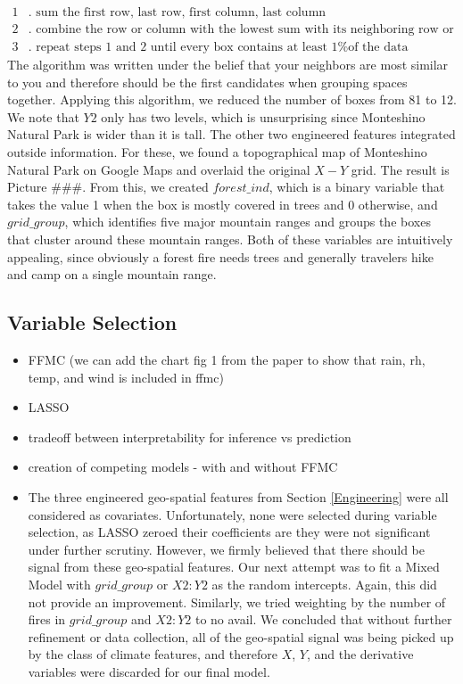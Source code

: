 \documentclass{article}
\begin{document}
\begin{itemize}
\begin{align*}
1&. \text{ sum the first row, last row, first column, last column} \\
2&. \text{ combine the row or column with the lowest sum with its neighboring row or column} \\
3&. \text{ repeat steps 1 and 2 until every box contains at least 1\% of the data}
\end{align*}
The algorithm was written under the belief that your neighbors are most similar to you and therefore should be the first candidates when grouping spaces together. Applying this algorithm, we reduced the number of boxes from 81 to 12. We note that $Y2$ only has two levels, which is unsurprising since Monteshino Natural Park is wider than it is tall. The other two engineered features integrated outside information. For these, we found a topographical map of Monteshino Natural Park on Google Maps and overlaid the original $X-Y$ grid.  The result is Picture \#\#\#. From this, we created $\textit{forest\_ind}$, which is a binary variable that takes the value 1 when the box is mostly covered in trees and 0 otherwise, and $\textit{grid\_group}$, which identifies five major mountain ranges and groups the boxes that cluster around these mountain ranges. Both of these variables are intuitively appealing, since obviously a forest fire needs trees and generally travelers hike and camp on a single mountain range.

\end{itemize}

\subsection{Variable Selection}

\begin{itemize}

\item FFMC
(we can add the chart fig 1 from the paper to show that rain, rh, temp, and wind is included in ffmc)
\item LASSO
\item tradeoff between interpretability for inference vs prediction
\item creation of competing models - with and without FFMC
\item The three engineered geo-spatial features from Section \ref{Engineering} were all considered as covariates. Unfortunately, none were selected during variable selection, as LASSO zeroed their coefficients are they were not significant under further scrutiny. However, we firmly believed that there should be signal from these geo-spatial features. Our next attempt was to fit a Mixed Model with $\textit{grid\_group}$ or $X2:Y2$ as the random intercepts. Again, this did not provide an improvement. Similarly, we tried weighting by the number of fires in $\textit{grid\_group}$ and $X2:Y2$ to no avail. We concluded that without further refinement or data collection, all of the geo-spatial signal was being picked up by the class of climate features, and therefore $X$, $Y$, and the derivative variables were discarded for our final model.

\end{itemize}
\end{document}

